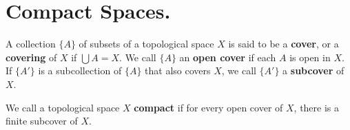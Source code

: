 
\section{Compact Spaces.}

\begin{definition}
    A collection $\{A\}$ of subsets of a topological space $X$ is said to be a  \textbf{cover}, or a
    \textbf{covering} of $X$ if  $\bigcup{A}=X$. We call $\{A\}$ an \textbf{open cover} if each $A$
    is open in  $X$. If  $\{A'\}$ is a subcollection of $\{A\}$ that also covers $X$, we call
    $\{A'\}$ a \textbf{subcover} of $X$.
\end{definition}

\begin{definition}
    We call a topological space $X$ \textbf{compact} if for every open cover of $X$, there is a
    finite subcover of $X$.
\end{definition}
